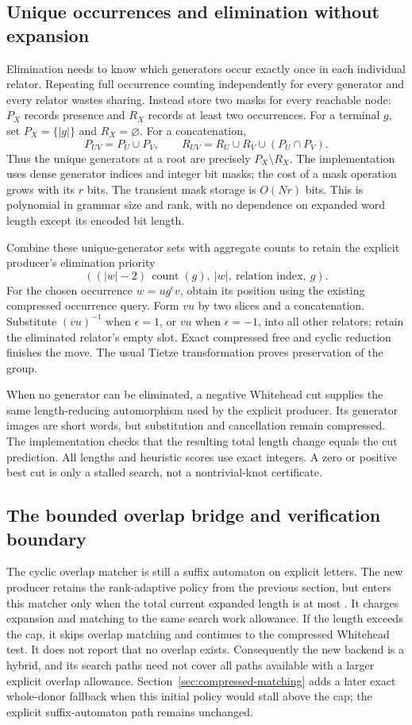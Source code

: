 \subsection{Unique occurrences and elimination without expansion}

Elimination needs to know which generators occur exactly once in each
individual relator. Repeating full occurrence counting independently for
every generator and every relator wastes sharing. Instead store two masks
for every reachable node: $P_X$ records presence and $R_X$ records at least
two occurrences. For a terminal $g$, set $P_X=\{ |g| \}$ and $R_X=\varnothing$.
For a concatenation,
\[
 P_{UV}=P_U\cup P_V,\qquad
 R_{UV}=R_U\cup R_V\cup(P_U\cap P_V).
\]
Thus the unique generators at a root are precisely $P_X\setminus R_X$.
The implementation uses dense generator indices and integer bit masks;
the cost of a mask operation grows with its $r$ bits. The transient mask
storage is $O(Nr)$ bits. This is polynomial in grammar size and rank, with
no dependence on expanded word length except its encoded bit length.

Combine these unique-generator sets with aggregate counts to retain the
explicit producer's elimination priority
\[
 ((|w|-2)\,\operatorname{count}(g),\ |w|,\ \text{relation index},\ g).
\]
For the chosen occurrence $w=u g^{\epsilon}v$, obtain its position using
the existing compressed occurrence query. Form $vu$ by two slices and a
concatenation. Substitute $(vu)^{-1}$ when $\epsilon=1$, or $vu$ when
$\epsilon=-1$, into all other relators; retain the eliminated relator's
empty slot. Exact compressed free and cyclic reduction finishes the move.
The usual Tietze transformation proves preservation of the group.

When no generator can be eliminated, a negative Whitehead cut supplies
the same length-reducing automorphism used by the explicit producer.
Its generator images are short words, but substitution and cancellation
remain compressed. The implementation checks that the resulting total
length change equals the cut prediction. All lengths and heuristic scores
use exact integers. A zero or positive best cut is only a stalled search,
not a nontrivial-knot certificate.

\subsection{The bounded overlap bridge and verification boundary}

The cyclic overlap matcher is still a suffix automaton on explicit letters.
The new producer retains the rank-adaptive policy from the previous section,
but enters this matcher only when the total current expanded length is at
most . It charges expansion and matching to the same
search work allowance. If the length exceeds the cap, it skips overlap
matching and continues to the compressed Whitehead test. It does not
report that no overlap exists. Consequently the new backend is a hybrid,
and its search paths need not cover all paths available with a larger
explicit overlap allowance. Section~\ref{sec:compressed-matching} adds a
later exact whole-donor fallback when this initial policy would stall above
the cap; the explicit suffix-automaton path remains unchanged.

